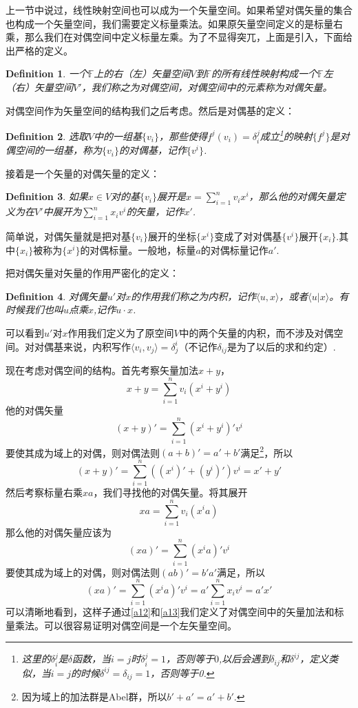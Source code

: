 \documentclass[11pt,a4paper,openany]{book}%
\theoremstyle{plain}%
\newtheorem{defi}{Definition}[chapter]%
\begin{document}
上一节中说过，线性映射空间也可以成为一个矢量空间。如果希望对偶矢量的集合也构成一个矢量空间，我们需要定义标量乘法。如果原矢量空间定义的是标量右乘，那么我们在对偶空间中定义标量左乘。为了不显得突兀，上面是引入，下面给出严格的定义。
\begin{defi}
一个$\mathbb{F}$上的右（左）矢量空间$V$到$\mathbb{F}$的所有线性映射构成一个$\mathbb{F}$左（右）矢量空间$V'$，我们称之为对偶空间，对偶空间中的元素称为对偶矢量。
\end{defi}
对偶空间作为矢量空间的结构我们之后考虑。然后是对偶基的定义：
\begin{defi}
选取$V$中的一组基$\{v_i\}$，那些使得$f^j(v_i)=\delta_i^j$成立\footnote{这里的$\delta_i^j$是$\delta$函数，当$i=j$时$\delta_i^j=1$，否则等于$0$,以后会遇到$\delta_{ij}$和$\delta^{ij}$，定义类似，当$i=j$的时候$\delta^{ij}=\delta_{ij}=1$，否则等于0.}的映射$\{f^j\}$是对偶空间的一组基，称为$\{v_i\}$的对偶基，记作$\{v^i\}$.
\end{defi}
接着是一个矢量的对偶矢量的定义：
\begin{defi}
如果$x\in V$对的基$\{v_i\}$展开是$x=\sum_{i=1}^{n}v_{i}x^{i}$，那么他的对偶矢量定义为在$V'$中展开为$\sum_{i=1}^{n}x_{i}v^{i}$的矢量，记作$x'$.
\end{defi}
简单说，对偶矢量就是把对基$\{v_i\}$展开的坐标$\{x^{i}\}$变成了对对偶基$\{v^i\}$展开$\{x_{i}\}$.其中$\{x_{i}\}$被称为$\{x^{i}\}$的对偶标量。一般地，标量$a$的对偶标量记作$a'$.

把对偶矢量对矢量的作用严密化的定义：
\begin{defi}
\label{内积}
对偶矢量$u'$对$x$的作用我们称之为内积，记作$\langle u,x \rangle$，或者$\langle u|x \rangle$。有时候我们也叫$u$点乘$x$,记作$u\cdot x$.
\end{defi}

\indent 可以看到$u'$对$x$作用我们定义为了原空间$V$中的两个矢量的内积，而不涉及对偶空间。对对偶基来说，内积写作$\langle v_i,v_j\rangle=\delta_{j}^i$（不记作$\delta_{ij}$是为了以后的求和约定）.

现在考虑对偶空间的结构。首先考察矢量加法$x+y$，
\[
x+y=\sum_{i=1}^{n}v_{i}(x^{i}+y^{i})
\]
他的对偶矢量
\[
(x+y)'=\sum_{i=1}^{n}(x^{i}+y^{i})'v^{i}
\]
要使其成为域上的对偶，则对偶法则$(a+b)'=a'+b'$满足\footnote{因为域上的加法群是Abel群，所以$b'+a'=a'+b'$.}，所以
\begin{equation}
\label{a12}
(x+y)'=\sum_{i=1}^{n}((x^{i})'+(y^{i})')v^{i}=x'+y'
\end{equation}
\indent 然后考察标量右乘$xa$，我们寻找他的对偶矢量。将其展开
\[
xa=\sum_{i=1}^{n}v_{i}(x^{i}a)
\]
那么他的对偶矢量应该为
\[
(xa)'=\sum_{i=1}^{n}(x^{i}a)'v^{i}
\]
要使其成为域上的对偶，则对偶法则$(ab)'=b'a'$满足，所以
\begin{equation}
\label{a13}
(xa)'=\sum_{i=1}^{n}(x^{i}a)'v^{i}=a'\sum_{i=1}^{n}x_{i}v^{i}=a'x'
\end{equation}
可以清晰地看到，这样子通过\eqref{a12}和\eqref{a13}我们定义了对偶空间中的矢量加法和标量乘法。可以很容易证明对偶空间是一个左矢量空间。
\end{document}
